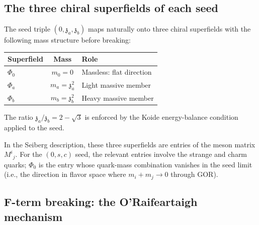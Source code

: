 \documentclass[12pt,a4paper]{article}
\newcommand{\zch}{\mathfrak{z}}
\begin{document}
\subsection{The three chiral superfields of each seed}

The seed triple $(0, \zch_a, \zch_b)$ maps naturally onto three 
chiral superfields with the following mass structure before breaking:

\begin{center}
\begin{tabular}{lcl}
\toprule
Superfield & Mass & Role \\
\midrule
$\Phi_0$ & $m_0 = 0$ & Massless: flat direction \\
$\Phi_a$ & $m_a = \zch_a^2$ & Light massive member \\
$\Phi_b$ & $m_b = \zch_b^2$ & Heavy massive member \\
\bottomrule
\end{tabular}
\end{center}

The ratio $\zch_a/\zch_b = 2 - \sqrt{3}$ is enforced by the 
Koide energy-balance condition applied to the seed.

In the Seiberg description, these three superfields are entries of 
the meson matrix $M^i{}_j$. For the $(0, s, c)$ seed, the relevant 
entries involve the strange and charm quarks; $\Phi_0$ is the entry 
whose quark-mass combination vanishes in the seed limit (i.e., the 
direction in flavor space where $m_i + m_j \to 0$ through GOR).

\subsection{F-term breaking: the O'Raifeartaigh mechanism}
\label{subsec:fterm}
\end{document}
